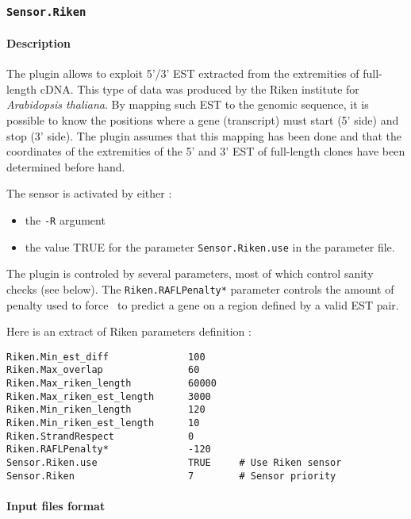 
\subsubsection{\texttt{Sensor.Riken}}

\paragraph{Description}

The plugin allows to exploit 5'/3' EST extracted from the extremities
of full-length cDNA. This type of data was produced by the Riken
institute for \emph{Arabidopsis thaliana}. By mapping such EST to the genomic
sequence, it is possible to know the positions where a gene
(transcript) must start (5' side) and stop (3' side). The plugin
assumes that this mapping has been done and that the coordinates of
the extremities of the 5' and 3' EST of full-length clones have been
determined before hand.

The sensor is activated by either :
\begin{itemize}
\item the \texttt{-R} argument 
\item the value TRUE for the parameter \texttt{Sensor.Riken.use} in the
  parameter file.
\end{itemize}

The plugin is controled by several parameters, most of which control
sanity checks (see below). The \texttt{Riken.RAFLPenalty*} parameter
controls the amount of penalty used to force \EuGene\ to predict a
gene on a region defined by a valid EST pair.

Here is an extract of Riken parameters definition :
\begin{Verbatim}[fontsize=\small]
Riken.Min_est_diff              100
Riken.Max_overlap               60
Riken.Max_riken_length          60000
Riken.Max_riken_est_length      3000
Riken.Min_riken_length          120 
Riken.Min_riken_est_length      10
Riken.StrandRespect             0
Riken.RAFLPenalty*              -120
Sensor.Riken.use                TRUE     # Use Riken sensor
Sensor.Riken                    7        # Sensor priority
\end{Verbatim}

\paragraph{Input files format}

